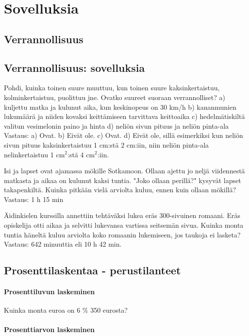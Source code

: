 %
\part{Sovelluksia}
%
%
\chapter{Verrannollisuus}
\chapter{Verrannollisuus: sovelluksia}

Pohdi, kuinka toinen suure muuttuu, kun toinen suure kaksinkertaistuu, kolminkertaistuu, puolittuu jne. Ovatko suureet suoraan verrannolliset?
a) kuljettu matka ja kulunut aika, kun keskinopeus on 30 km/h
b) kananmunien lukumäärä ja niiden kovaksi keittämiseen tarvittava keittoaika
c) hedelmätiskiltä valitun vesimelonin paino ja hinta
d) neliön sivun pituus ja neliön pinta-ala
Vastaus:
a) Ovat.
b) Eivät ole.
c) Ovat.
d) Eivät ole, sillä esimerkiksi kun neliön sivun pituus kaksinkertaistuu 1 cm:stä 2 cm:iin, niin neliön pinta-ala nelinkertaistuu 1 cm$^2$:stä 4 cm$^2$:iin.

Isi ja lapset ovat ajamassa mökille Sotkamoon. Ollaan ajettu jo neljä viidennestä matkasta ja aikaa on kulunut kaksi tuntia. "Joko ollaan perillä?" kysyvät lapset takapenkiltä. Kuinka pitkään vielä arviolta kuluu, ennen kuin ollaan mökillä?
Vastaus: 1 h 15 min

Äidinkielen kurssilla annettiin tehtäväksi lukea eräs 300-sivuinen romaani. Eräs opiskelija otti aikaa ja selvitti lukevansa vartissa seitsemän sivua. Kuinka monta tuntia häneltä kuluu arviolta koko romaanin lukemiseen, jos taukoja ei lasketa?
Vastaus: 642 minuuttia eli 10 h 42 min.

\chapter{Prosenttilaskentaa - perustilanteet}

\subsection{Prosenttiluvun laskeminen}

Kuinka monta euroa on 6 $\%$ 350 eurosta?

\subsection{Prosenttiarvon laskeminen}

